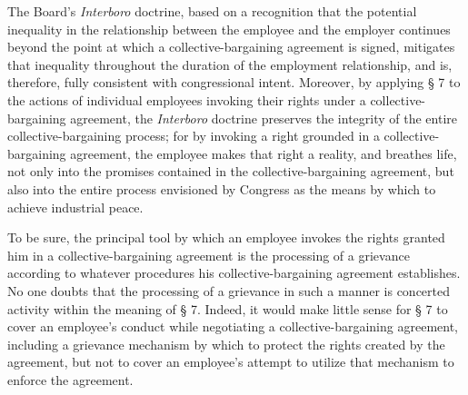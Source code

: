 \documentclass[
  letterpaper,
  11pt,
  DIV=9,
  openright]{scrbook}
\begin{document}
The Board's \emph{Interboro} doctrine, based on a recognition that the
potential inequality in the relationship between the employee and the
employer continues beyond the point at which a collective-bargaining
agreement is signed, mitigates that inequality throughout the duration
of the employment relationship, and is, therefore, fully consistent with
congressional intent. Moreover, by applying § 7 to the actions of
individual employees invoking their rights under a collective-bargaining
agreement, the \emph{Interboro} doctrine preserves the integrity of the
entire collective-bargaining process; for by invoking a right grounded
in a collective-bargaining agreement, the employee makes that right a
reality, and breathes life, not only into the promises contained in the
collective-bargaining agreement, but also into the entire process
envisioned by Congress as the means by which to achieve industrial
peace.

To be sure, the principal tool by which an employee invokes the rights
granted him in a collective-bargaining agreement is the processing of a
grievance according to whatever procedures his collective-bargaining
agreement establishes. No one doubts that the processing of a grievance
in such a manner is concerted activity within the meaning of § 7.
Indeed, it would make little sense for § 7 to cover an employee's
conduct while negotiating a collective-bargaining agreement, including a
grievance mechanism by which to protect the rights created by the
agreement, but not to cover an employee's attempt to utilize that
mechanism to enforce the agreement.
\end{document}
